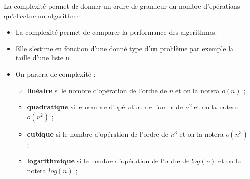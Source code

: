 \begin{definition2}
La complexité permet de donner un ordre de grandeur du nombre d'opérations qu'effectue un algorithme.
\begin{itemize}
\item La complexité permet de comparer la performance des algorithmes.
\item Elle s'estime en fonction d'une donné type d'un problème par exemple la taille d'une liste \texttt{n}.
\item On parlera de complexité : 
\begin{itemize}
\item \textbf{linéaire} si le nombre d'opération de l'ordre de $n$ et on la notera $o(n)$ ;
\item \textbf{quadratique} si le nombre d'opération de l'ordre de $n^2$ et on la notera $o(n^2)$ ;
\item \textbf{cubique} si le nombre d'opération de l'ordre de $n^3$ et on la notera $o(n^3)$ ;
\item \textbf{logarithmique} si le nombre d'opération de l'ordre de $log(n)$ et on la notera $log(n)$ ;
\end{itemize}
\end{itemize}
\end{definition2}

